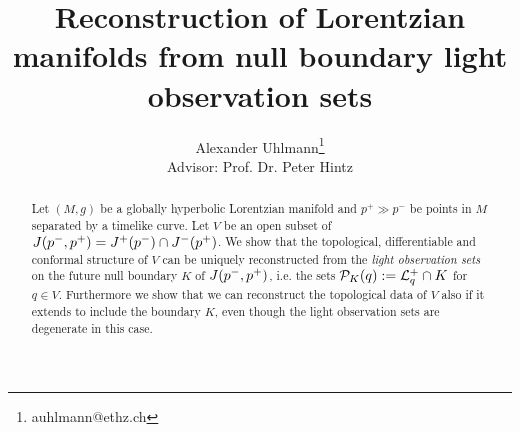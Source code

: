 \documentclass[12pt,notitlepage]{report}
\title{Reconstruction of Lorentzian manifolds from null boundary light observation sets}
\author{Alexander Uhlmann\thanks{auhlmann@ethz.ch}\\
Advisor: Prof. Dr. Peter Hintz}
\begin{document}
\maketitle


\begin{abstract}
    Let $(M,g)$ be a globally hyperbolic Lorentzian manifold and $p^+\gg p^-$ be points in $M$ separated by a timelike curve. Let $V$ be an open subset of $J(p^-,p^+) = J^+(p^-)\cap J^-(p^+)$. We show that the topological, differentiable and conformal structure of $V$ can be uniquely reconstructed from the \emph{light observation sets} on the future null boundary $K$ of $J(p^-,p^+)$, i.e. the sets ${\mathcal{P}}_K(q) := {\mathcal{L}}^+_q \cap K$ for $q\in V$. Furthermore we show that we can reconstruct the topological data of $V$ also if it extends to include the boundary $K$, even though the light observation sets are degenerate in this case.
\end{abstract}


\tableofcontents






%




%
%
%

%
%

\newpage

\nocite{*}
\printbibliography

\appendix





%

%
\end{document}
